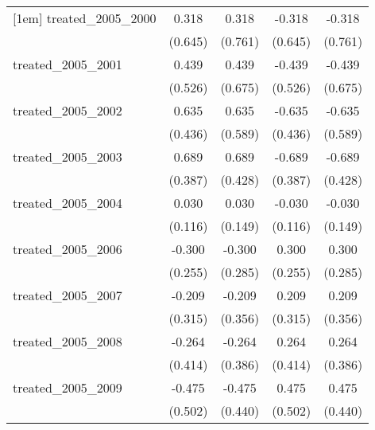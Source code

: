 {\begin{tabular}{l*{4}{c}}
[1em]
treated\_2005\_2000&       0.318         &       0.318         &      -0.318         &      -0.318         \\
            &     (0.645)         &     (0.761)         &     (0.645)         &     (0.761)         \\
[1em]
treated\_2005\_2001&       0.439         &       0.439         &      -0.439         &      -0.439         \\
            &     (0.526)         &     (0.675)         &     (0.526)         &     (0.675)         \\
[1em]
treated\_2005\_2002&       0.635         &       0.635         &      -0.635         &      -0.635         \\
            &     (0.436)         &     (0.589)         &     (0.436)         &     (0.589)         \\
[1em]
treated\_2005\_2003&       0.689         &       0.689         &      -0.689         &      -0.689         \\
            &     (0.387)         &     (0.428)         &     (0.387)         &     (0.428)         \\
[1em]
treated\_2005\_2004&       0.030         &       0.030         &      -0.030         &      -0.030         \\
            &     (0.116)         &     (0.149)         &     (0.116)         &     (0.149)         \\
[1em]
treated\_2005\_2006&      -0.300         &      -0.300         &       0.300         &       0.300         \\
            &     (0.255)         &     (0.285)         &     (0.255)         &     (0.285)         \\
[1em]
treated\_2005\_2007&      -0.209         &      -0.209         &       0.209         &       0.209         \\
            &     (0.315)         &     (0.356)         &     (0.315)         &     (0.356)         \\
[1em]
treated\_2005\_2008&      -0.264         &      -0.264         &       0.264         &       0.264         \\
            &     (0.414)         &     (0.386)         &     (0.414)         &     (0.386)         \\
[1em]
treated\_2005\_2009&      -0.475         &      -0.475         &       0.475         &       0.475         \\
            &     (0.502)         &     (0.440)         &     (0.502)         &     (0.440)         \\

\end{tabular}}
